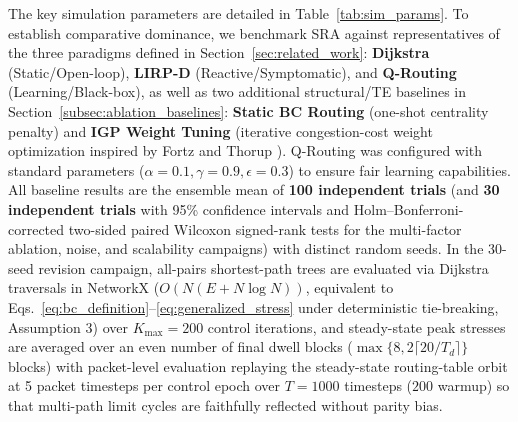 \documentclass[journal]{IEEEtran}
\theoremstyle{plain}
\theoremstyle{definition}
\newcommand{\rev}[1]{{\color{blue}#1}}
\begin{document}
The key simulation parameters are detailed in Table~\ref{tab:sim_params}.
To establish comparative dominance, we benchmark SRA against representatives of the three paradigms defined in Section~\ref{sec:related_work}:
\textbf{Dijkstra} (Static/Open-loop), \textbf{LIRP-D} (Reactive/Symptomatic), and \textbf{Q-Routing} \cite{Dou2020QLearningRouting} (Learning/Black-box), \rev{as well as two additional structural/TE baselines in Section~\ref{subsec:ablation_baselines}: \textbf{Static BC Routing} (one-shot centrality penalty) and \textbf{IGP Weight Tuning} (iterative congestion-cost weight optimization inspired by Fortz and Thorup \cite{Fortz2000OSPF})}.
Q-Routing was configured with standard parameters ($\alpha=0.1, \gamma=0.9, \epsilon=0.3$) to ensure fair learning capabilities.
All baseline results are the ensemble mean of \textbf{100 independent trials} (and \rev{\textbf{30 independent trials} with 95\% confidence intervals and Holm--Bonferroni-corrected two-sided paired Wilcoxon signed-rank tests for the multi-factor ablation, noise, and scalability campaigns}) with distinct random seeds. \rev{In the 30-seed revision campaign, all-pairs shortest-path trees are evaluated via Dijkstra traversals in NetworkX ($O(N(E+N\log N))$, equivalent to Eqs.~\eqref{eq:bc_definition}--\eqref{eq:generalized_stress} under deterministic tie-breaking, Assumption 3) over $K_{\max}=200$ control iterations, and steady-state peak stresses are averaged over an even number of final dwell blocks ($\max\{8, 2\lceil 20/T_d\rceil\}$ blocks) with packet-level evaluation replaying the steady-state routing-table orbit at 5 packet timesteps per control epoch over $T=1000$ timesteps ($200$ warmup) so that multi-path limit cycles are faithfully reflected without parity bias.}
\end{document}
